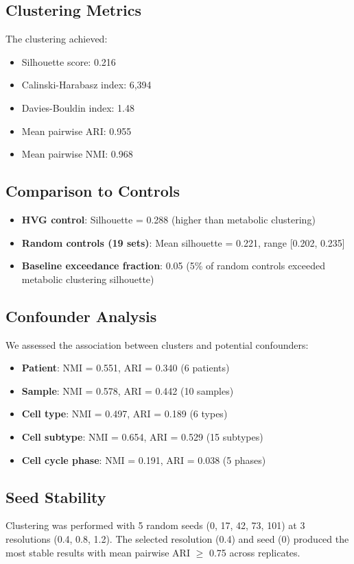 \documentclass[12pt, a4paper]{article}
\begin{document}
\subsection{Clustering Metrics}
The clustering achieved:
\begin{itemize}
    \item Silhouette score: 0.216
    \item Calinski-Harabasz index: 6,394
    \item Davies-Bouldin index: 1.48
    \item Mean pairwise ARI: 0.955
    \item Mean pairwise NMI: 0.968
\end{itemize}

\subsection{Comparison to Controls}
\begin{itemize}
    \item \textbf{HVG control}: Silhouette = 0.288 (higher than metabolic clustering)
    \item \textbf{Random controls (19 sets)}: Mean silhouette = 0.221, range [0.202, 0.235]
    \item \textbf{Baseline exceedance fraction}: 0.05 (5\% of random controls exceeded metabolic clustering silhouette)
\end{itemize}

\subsection{Confounder Analysis}
We assessed the association between clusters and potential confounders:
\begin{itemize}
    \item \textbf{Patient}: NMI = 0.551, ARI = 0.340 (6 patients)
    \item \textbf{Sample}: NMI = 0.578, ARI = 0.442 (10 samples)
    \item \textbf{Cell type}: NMI = 0.497, ARI = 0.189 (6 types)
    \item \textbf{Cell subtype}: NMI = 0.654, ARI = 0.529 (15 subtypes)
    \item \textbf{Cell cycle phase}: NMI = 0.191, ARI = 0.038 (5 phases)
\end{itemize}

\subsection{Seed Stability}
Clustering was performed with 5 random seeds (0, 17, 42, 73, 101) at 3 resolutions (0.4, 0.8, 1.2). The selected resolution (0.4) and seed (0) produced the most stable results with mean pairwise ARI $\ge$ 0.75 across replicates.
\end{document}
